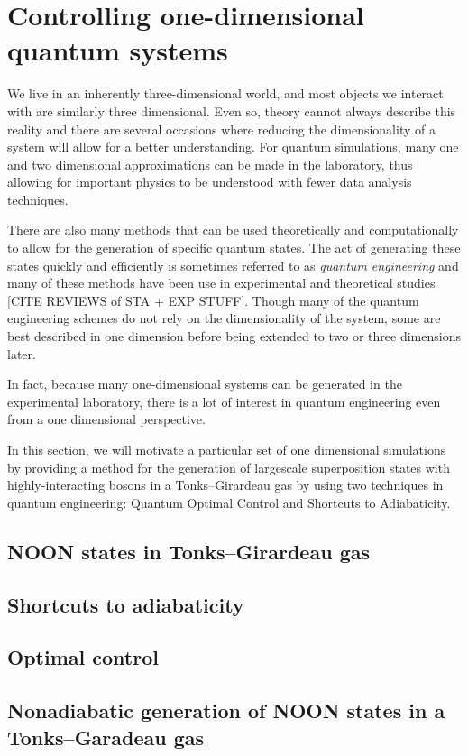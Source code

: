 \chapter{Controlling one-dimensional quantum systems}
\label{ch:1d}

We live in an inherently three-dimensional world, and most objects we interact with are similarly three dimensional.
Even so, theory cannot always describe this reality and there are several occasions where reducing the dimensionality of a system will allow for a better understanding.
For quantum simulations, many one and two dimensional approximations can be made in the laboratory, thus allowing for important physics to be understood with fewer data analysis techniques.

There are also many methods that can be used theoretically and computationally to allow for the generation of specific quantum states.
The act of generating these states quickly and efficiently is sometimes referred to as \textit{quantum engineering} and many of these methods have been use in experimental and theoretical studies [CITE REVIEWS of STA + EXP STUFF].
Though many of the quantum engineering schemes do not rely on the dimensionality of the system, some are best described in one dimension before being extended to two or three dimensions later.

In fact, because many one-dimensional systems can be generated in the experimental laboratory, there is a lot of interest in quantum engineering even from a one dimensional perspective.

In this section, we will motivate a particular set of one dimensional simulations by providing a method for the generation of largescale superposition states with highly-interacting bosons in a Tonks--Girardeau gas by using two techniques in quantum engineering: Quantum Optimal Control and Shortcuts to Adiabaticity.

\section{NOON states in Tonks--Girardeau gas}

\section{Shortcuts to adiabaticity}
\section{Optimal control}


\section{Nonadiabatic generation of NOON states in a Tonks--Garadeau gas}
